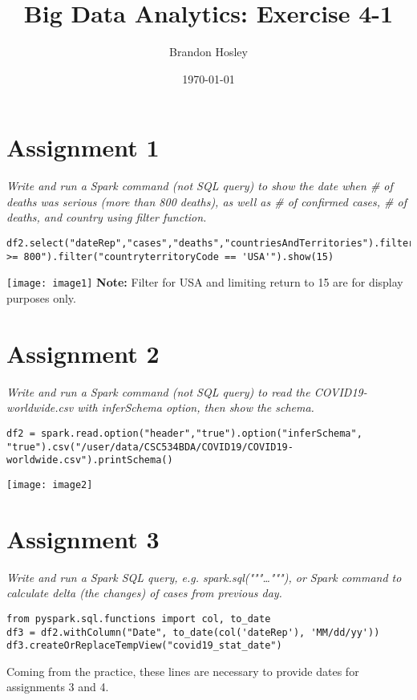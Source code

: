 \documentclass[]{article}
\title{Big Data Analytics: Exercise 4-1}
\author{Brandon Hosley}
\date{\today}
\begin{document}
\maketitle

\section*{Assignment 1}
\emph{ Write and run a Spark command (not SQL query) to show the date when # of deaths was serious (more than 800 deaths), as well as # of confirmed cases, # of deaths, and country using filter function. }

\begin{verbatim}
df2.select("dateRep","cases","deaths","countriesAndTerritories").filter("deaths >= 800").filter("countryterritoryCode == 'USA'").show(15)
\end{verbatim}
\texttt{[image: image1]} %
\textbf{Note:} Filter for USA and limiting return to 15 are for display purposes only.

\section*{Assignment 2}
\emph{ Write and run a Spark command (not SQL query) to read the COVID19-worldwide.csv with inferSchema option, then show the schema.
}

\begin{verbatim}
df2 = spark.read.option("header","true").option("inferSchema", "true").csv("/user/data/CSC534BDA/COVID19/COVID19-worldwide.csv").printSchema()
\end{verbatim}
\texttt{[image: image2]} %

\section*{Assignment 3}
\emph{ Write and run a Spark SQL query, e.g. spark.sql("""\ldots"""), or Spark command to calculate delta (the changes) of cases from previous day. }

\begin{verbatim}
from pyspark.sql.functions import col, to_date
df3 = df2.withColumn("Date", to_date(col('dateRep'), 'MM/dd/yy'))
df3.createOrReplaceTempView("covid19_stat_date")
\end{verbatim}
Coming from the practice, these lines are necessary to provide dates for assignments 3 and 4.
\end{document}
